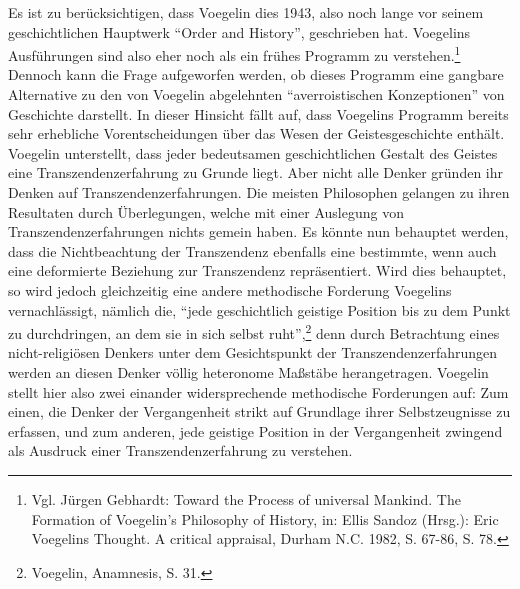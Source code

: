 Es ist zu berücksichtigen, dass Voegelin dies 1943, also noch lange vor seinem
geschichtlichen Hauptwerk "`Order and History"', geschrieben hat. Voegelins
Ausführungen sind also eher noch als ein frühes Programm zu
verstehen.\footnote{Vgl. Jürgen Gebhardt: Toward the Process of universal
  Mankind. The Formation of Voegelin's Philosophy of History, in: Ellis Sandoz
  (Hrsg.): Eric Voegelins Thought. A critical appraisal, Durham N.C. 1982, S.
  67-86, S. 78.} Dennoch kann die Frage aufgeworfen werden, ob dieses Programm
eine gangbare Alternative zu den von Voegelin abgelehnten "`averroistischen
Konzeptionen"' von Geschichte darstellt. In dieser Hinsicht fällt auf, dass
Voegelins Programm bereits sehr erhebliche Vorentscheidungen über das Wesen
der Geistesgeschichte enthält.  Voegelin unterstellt, dass jeder bedeutsamen
geschichtlichen Gestalt des Geistes eine Transzendenzerfahrung zu Grunde
liegt. Aber nicht alle Denker gründen ihr Denken auf Transzendenzerfahrungen.
Die meisten Philosophen gelangen zu ihren Resultaten durch Überlegungen,
welche mit einer Auslegung von Transzendenzerfahrungen nichts gemein haben. Es
könnte nun behauptet werden, dass die Nichtbeachtung der Transzendenz
ebenfalls eine bestimmte, wenn auch eine deformierte Beziehung zur
Transzendenz repräsentiert. Wird dies behauptet, so wird jedoch gleichzeitig
eine andere methodische Forderung Voegelins vernachlässigt, nämlich die,
"`jede geschichtlich geistige Position bis zu dem Punkt zu durchdringen, an
dem sie in sich selbst ruht"',\footnote{Voegelin, Anamnesis, S. 31.} denn
durch Betrachtung eines nicht-religiösen Denkers unter dem Gesichtspunkt der
Transzendenzerfahrungen werden an diesen Denker völlig heteronome Maßstäbe
herangetragen. Voegelin stellt hier also zwei einander widersprechende
methodische Forderungen auf: Zum einen, die Denker der Vergangenheit strikt
auf Grundlage ihrer Selbstzeugnisse zu erfassen, und zum anderen, jede
geistige Position in der Vergangenheit zwingend als Ausdruck einer
Transzendenzerfahrung zu verstehen.

